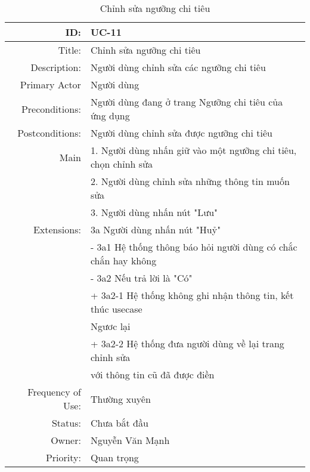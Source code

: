 \documentclass[a4paper,10pt]{article}
\begin{document}
\newpage
\begin{table}[ht]
 \centering
 \caption{Chỉnh sửa ngưỡng chi tiêu} 
 \begin{tabular}{| r | l |}

  \hline 
  ID:  & UC-11 \\ \hline  
  Title:  & Chỉnh sửa ngưỡng chi tiêu  \\ \hline
  Description: & Người dùng chỉnh sửa các ngưỡng chi tiêu  \\ \hline
  Primary Actor & Người dùng  \\ \hline
  Preconditions:  & Người dùng đang ở trang Ngưỡng chi tiêu của ứng dụng \\ \hline
  Postconditions: & Người dùng chỉnh sửa được ngưỡng chi tiêu \\ \hline
  Main & {1}. Người dùng nhấn giữ vào một ngưỡng chi tiêu, chọn chỉnh sửa\\
       & {2}. Người dùng chỉnh sửa những thông tin muốn sửa \\
       & {3}. Người dùng nhấn nút "Lưu"  \\ \hline
  Extensions: & {3a} Người dùng nhấn nút "Huỷ"  \\ \hline
       & \hspace{3mm} - {3a1} Hệ thống thông báo hỏi người dùng có chắc chắn hay không  \\ 
       & \hspace{3mm} - {3a2} Nếu trả lời là "Có"  \\
       & \hspace{15mm} + {3a2-1} Hệ thống không ghi nhận thông tin, kết thúc usecase  \\ 
       & \hspace{12mm}   Ngươc lại   \\
       & \hspace{15mm} + {3a2-2} Hệ thống đưa người dùng về lại trang chỉnh sửa \\
       & \hspace{28mm}  với thông tin cũ đã được điền  \\
  \hline
  Frequency of Use: & Thường xuyên \\ \hline
  Status: & Chưa bắt đầu  \\ \hline
  Owner: & Nguyễn Văn Mạnh  \\ \hline
  Priority: & Quan trọng \\
  \hline 
 \end{tabular}

\end{table}
\end{document}
